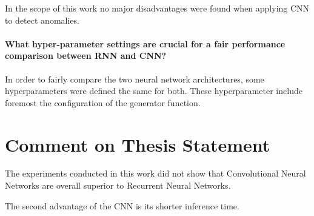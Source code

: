 In the scope of this work no major disadvantages were found when applying CNN to detect anomalies.


\paragraph{What hyper-parameter settings are crucial for a fair performance comparison between RNN and CNN?} In order to fairly compare the two neural network architectures, some hyperparameters were defined the same for both. These hyperparameter include foremost the configuration of the generator function. 







\section{Comment on Thesis Statement}

The experiments conducted in this work did not show that Convolutional Neural Networks are overall superior to Recurrent Neural Networks. 

The second advantage of the CNN is its shorter inference time. 






